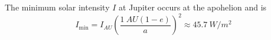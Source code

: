 
The minimum solar intensity $I$ at Jupiter occurs at the apohelion and is
\begin{equation}
  I_{\mathrm{min}} = I_{\si{AU}} (\frac{\SI{1}{AU} (1 - e)}{a})^2
  \approx \SI{45.7}{W/m^2}
\end{equation}






